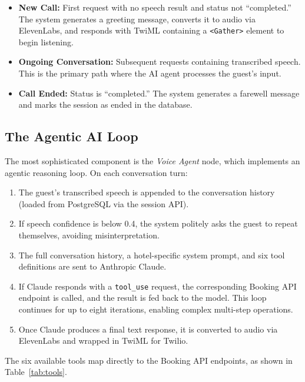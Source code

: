 \documentclass[conference]{IEEEtran}
\begin{document}
\begin{itemize}
    \item \textbf{New Call:} First request with no speech result and status not ``completed.'' The system generates a greeting message, converts it to audio via ElevenLabs, and responds with TwiML containing a \texttt{<Gather>} element to begin listening.
    
    \item \textbf{Ongoing Conversation:} Subsequent requests containing transcribed speech. This is the primary path where the AI agent processes the guest's input.
    
    \item \textbf{Call Ended:} Status is ``completed.'' The system generates a farewell message and marks the session as ended in the database.
\end{itemize}

\subsection{The Agentic AI Loop}

The most sophisticated component is the \textit{Voice Agent} node, which implements an agentic reasoning loop. On each conversation turn:

\begin{enumerate}
    \item The guest's transcribed speech is appended to the conversation history (loaded from PostgreSQL via the session API).
    \item If speech confidence is below 0.4, the system politely asks the guest to repeat themselves, avoiding misinterpretation.
    \item The full conversation history, a hotel-specific system prompt, and six tool definitions are sent to Anthropic Claude.
    \item If Claude responds with a \texttt{tool\_use} request, the corresponding Booking API endpoint is called, and the result is fed back to the model. This loop continues for up to eight iterations, enabling complex multi-step operations.
    \item Once Claude produces a final text response, it is converted to audio via ElevenLabs and wrapped in TwiML for Twilio.
\end{enumerate}

The six available tools map directly to the Booking API endpoints, as shown in Table~\ref{tab:tools}.
\end{document}
